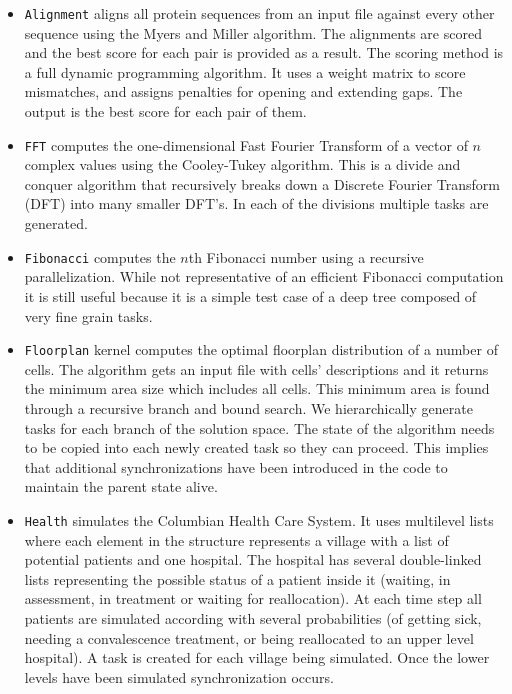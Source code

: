 \documentclass[sigconf]{acmart}
\begin{document}
\begin{itemize}
\item \texttt{Alignment} aligns all protein sequences from  an  input
file  against  every  other  sequence  using  the Myers and Miller 
algorithm. The alignments are scored and the best score for each pair is
provided as a result. The scoring method is  a  full  dynamic  programming
algorithm. It uses  a  weight matrix to score mismatches, and assigns
penalties for opening and extending gaps. The output is the best score for each
pair of them.
\item \texttt{FFT} computes the one-dimensional Fast Fourier Transform
of a vector of $n$ complex values using the Cooley-Tukey 
algorithm. This is a divide and conquer algorithm that  recursively  breaks
down a Discrete Fourier Transform (DFT) into many smaller DFT’s. In each of the
divisions multiple tasks are generated.
\item \texttt{Fibonacci} computes the $n$th Fibonacci number using a  recursive
parallelization. While  not  representative  of  an efficient  Fibonacci
computation  it  is  still  useful  because  it  is a simple test case of a
deep tree composed of very fine grain tasks.  
\item \texttt{Floorplan} kernel computes the optimal floorplan distribution
of a number of cells. The algorithm gets an input file with  cells'
descriptions  and  it  returns  the  minimum  area  size which includes all
cells. This minimum area is found through a recursive branch and bound search.
We hierarchically generate tasks  for  each  branch  of  the  solution  space.
The  state  of  the algorithm needs to be copied into each newly created task
so they can proceed. This implies that additional synchronizations have been
introduced in the code to maintain the parent state alive.
\item \texttt{Health} simulates the Columbian Health Care System. It
uses multilevel lists where each element in the structure  represents  a
village with  a  list  of  potential patients and one hospital. The hospital
has several double-linked lists representing the possible status of a patient
inside it (waiting, in assessment,   in   treatment   or   waiting   for
reallocation).  At  each time step  all  patients  are  simulated  according
with several probabilities (of getting sick, needing a convalescence treatment,
or  being  reallocated to  an  upper  level  hospital).  A  task  is  created
for  each  village being  simulated. Once the lower levels have been simulated
synchronization occurs. 

\end{itemize}
\end{document}
